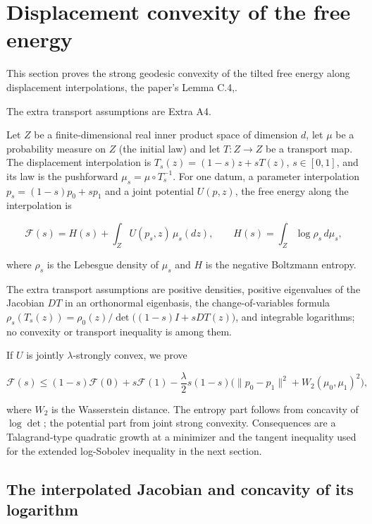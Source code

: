 \documentclass[11pt,a4paper]{report}
\begin{document}
\section{\texorpdfstring{Displacement convexity of the free energy}{Displacement convexity of the free energy}}


This section proves the strong geodesic convexity of the tilted free energy along displacement interpolations, the paper's Lemma C.4,.




The extra transport assumptions are Extra A4.




Let \(Z\) be a finite-dimensional real inner product space of dimension \(d\), let \(\mu\) be a probability measure on \(Z\) (the initial law) and let \(T:Z\to Z\) be a transport map. The displacement interpolation is \(T_s(z)=(1-s)z+sT(z)\), \(s\in[0,1]\), and its law is the pushforward \(\mu_s=\mu\circ T_s^{-1}\). For one datum, a parameter interpolation \(p_s=(1-s)p_0+sp_1\) and a joint potential \(U(p,z)\), the free energy along the interpolation is


\[\mathcal F(s)=H(s)+\int_ZU(p_s,z)\,\mu_s(dz),\qquad H(s)=\int_Z\log\rho_s\,d\mu_s,\]


where \(\rho_s\) is the Lebesgue density of \(\mu_s\) and \(H\) is the negative Boltzmann entropy.




The extra transport assumptions are positive densities, positive eigenvalues of the Jacobian \(DT\) in an orthonormal eigenbasis, the change-of-variables formula \(\rho_s(T_s(z))=\rho_0(z)/\det\bigl((1-s)I+sDT(z)\bigr)\), and integrable logarithms; no convexity or transport inequality is among them.




If \(U\) is jointly \(\lambda\)-strongly convex, we prove


\[\mathcal F(s)\le(1-s)\mathcal F(0)+s\mathcal F(1)-\frac\lambda2s(1-s)\bigl(\|p_0-p_1\|^2+W_2(\mu_0,\mu_1)^2\bigr),\]


where \(W_2\) is the Wasserstein distance. The entropy part follows from concavity of \(\log\det\); the potential part from joint strong convexity. Consequences are a Talagrand-type quadratic growth at a minimizer and the tangent inequality used for the extended log-Sobolev inequality in the next section.

\subsection{\texorpdfstring{The interpolated Jacobian and concavity of its logarithm}{The interpolated Jacobian and concavity of its logarithm}}
\end{document}
